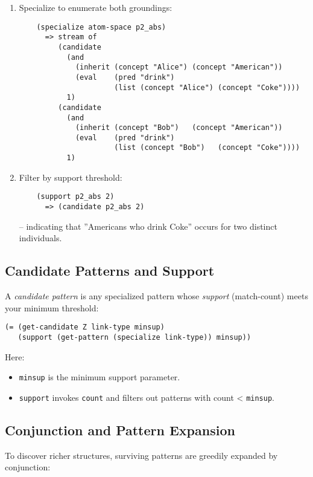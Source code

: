 \documentclass{article}
\begin{document}
\begin{enumerate}
\item  Specialize to enumerate both groundings:
    \begin{verbatim}
    (specialize atom-space p2_abs)
      => stream of
         (candidate
           (and
             (inherit (concept "Alice") (concept "American"))
             (eval    (pred "drink")
                      (list (concept "Alice") (concept "Coke"))))
           1)
         (candidate
           (and
             (inherit (concept "Bob")   (concept "American"))
             (eval    (pred "drink")
                      (list (concept "Bob")   (concept "Coke"))))
           1)
    \end{verbatim}

\item  Filter by support threshold:
    \begin{verbatim}
    (support p2_abs 2)
      => (candidate p2_abs 2)
    \end{verbatim}
  -- indicating that ''Americans who drink Coke'' occurs for two distinct individuals.

\end{enumerate}

\subsection{Candidate Patterns and Support}

A \emph{candidate pattern} is any specialized pattern whose \emph{support} (match-count) meets your minimum threshold:

\begin{verbatim}
(= (get-candidate Z link-type minsup)
   (support (get-pattern (specialize link-type)) minsup))
\end{verbatim}

Here:
\begin{itemize}
  \item \texttt{minsup} is the minimum support parameter.
  \item \texttt{support} invokes \texttt{count} and filters out patterns with count < \texttt{minsup}.
\end{itemize}

\subsection{Conjunction and Pattern Expansion}

To discover richer structures, surviving patterns are greedily expanded by conjunction:
\end{document}
